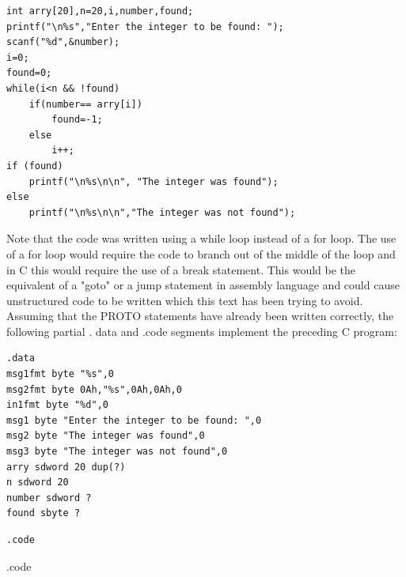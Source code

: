 \documentclass[10pt]{book}
\begin{document}
\begin{center}
\begin{center}
\begin{verbatim}
int arry[20],n=20,i,number,found;
printf("\n%s","Enter the integer to be found: ");
scanf("%d",&number);
i=0;
found=0;
while(i<n && !found)
    if(number== arry[i])
        found=-1;
    else
        i++;
if (found)
    printf("\n%s\n\n", "The integer was found");
else
    printf("\n%s\n\n","The integer was not found");
\end{verbatim}

Note that the code was written using a while loop instead of a for loop. The use of a for loop would require the code to branch out of the middle of the loop and in C this would require the use of a break statement. This would be the equivalent of a "goto" or a jump statement in assembly language and could cause unstructured code to be written which this text has been trying to avoid. Assuming that the PROTO statements have already been written correctly, the following partial . data and .code segments implement the preceding C program:

\begin{verbatim}
.data
msg1fmt byte "%s",0
msg2fmt byte 0Ah,"%s",0Ah,0Ah,0
in1fmt byte "%d",0
msg1 byte "Enter the integer to be found: ",0
msg2 byte "The integer was found",0
msg3 byte "The integer was not found",0
arry sdword 20 dup(?)
n sdword 20
number sdword ?
found sbyte ?
\end{verbatim}

\begin{verbatim}
.code
\end{verbatim}

.code\\


\end{center}
\end{center}
\end{document}
